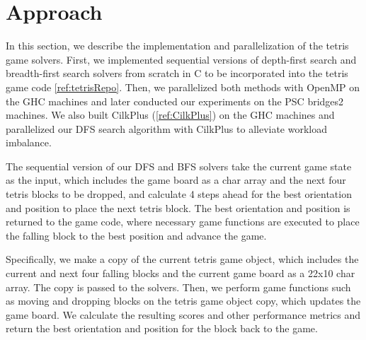 \vspace{0.5em}
\section{Approach}


In this section, we describe the implementation and parallelization of the tetris game solvers. First, we implemented sequential versions of depth-first search and breadth-first search solvers from scratch in C to be incorporated into the tetris game code \ref{ref:tetrisRepo}. Then, we parallelized both methods with OpenMP on the GHC machines and later conducted our experiments on the PSC bridges2 machines. We also built CilkPlus (\ref{ref:CilkPlus}) on the GHC machines and parallelized our DFS search algorithm with CilkPlus to alleviate workload imbalance.

The sequential version of our DFS and BFS solvers take the current game state as the input, which includes the game board as a char array and the next four tetris blocks to be dropped, and calculate 4 steps ahead for the best orientation and position to place the next tetris block. The best orientation and position is returned to the game code, where necessary game functions are executed to place the falling block to the best position and advance the game.

Specifically, we make a copy of the current tetris game object, which includes the current and next four falling blocks and the current game board as a 22x10 char array. The copy is passed to the solvers. Then, we perform game functions such as moving and dropping blocks on the tetris game object copy, which updates the game board. We calculate the resulting scores and other performance metrics and return the best orientation and position for the block back to the game.

